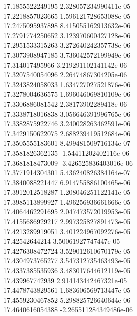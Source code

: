 {17.1855522249195 2.328057234990411e-05 \\
17.2218857023665 1.596121728653088e-05 \\
17.2475095937898 8.415055162913632e-06 \\
17.2791774250652 3.123970600427128e-06 \\
17.2951533315263 3.272640242357738e-06 \\
17.3073908947185 3.736042572199949e-06 \\
17.314017495966 3.219291102141142e-06 \\
17.3207540054096 2.26474867304205e-06 \\
17.3243824058033 1.634727027521876e-06 \\
17.3278004636575 1.696046069810109e-06 \\
17.3306886081542 2.38173902289418e-06 \\
17.3338718016838 3.056646391996765e-06 \\
17.3382875922746 3.240028263462591e-06 \\
17.3429150622075 2.688239419512684e-06 \\
17.3505555183601 8.499481509716134e-07 \\
17.3581826362135 -1.54411202402116e-06 \\
17.3681818473009 -3.426525836403016e-06 \\
17.3771914304301 5.436240826384164e-07 \\
17.3840088221447 6.914755886100465e-06 \\
17.3912012518287 1.208046251122141e-05 \\
17.3985113899927 1.496256936661666e-05 \\
17.4064462291695 2.047473572019953e-05 \\
17.4155686929217 2.997325827891473e-05 \\
17.4213289919051 3.401224967092276e-05 \\
17.42542644214 3.50061927747447e-05 \\
17.4276308472724 3.529012610670179e-05 \\
17.4304973765277 3.547312735463493e-05 \\
17.4337385535936 3.483017644612119e-05 \\
17.439967742939 2.914143442467321e-05 \\
17.4478743829561 1.683606569713447e-05 \\
17.4559230467852 5.298825726640644e-06 \\
17.4640616054388 -2.265511284349486e-06 \\
}

